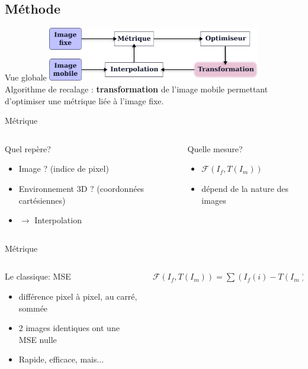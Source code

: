 \documentclass{beamer}
\begin{document}
\subsection{Méthode}
\begin{frame}{Vue globale}
\centering
\includegraphics[width=0.7\textwidth]{images/recalage.png}\\
Algorithme de recalage : {\bfseries transformation} de l'image mobile permettant d'optimiser une métrique liée à l'image fixe. 
\end{frame}
\begin{frame}{Métrique}
   \begin{columns}[T]
 \begin{column}{0.5\textwidth}
\begin{block}{Quel repère?}
\begin{itemize}
  \item Image ? (indice de pixel)
  \item Environnement 3D ? (coordonnées cartésiennes)
  \item $\rightarrow$ Interpolation
  \end{itemize}
\end{block}
 \end{column}
 \begin{column}{0.5\textwidth}
\begin{block}{Quelle mesure?}
\begin{itemize}
  \item $\mathcal{F}(I_f, T(I_m))$
  \item dépend de la nature des images
  \end{itemize}
\end{block}
\end{column}
\end{columns}
\end{frame}
\begin{frame}{Métrique}
\centering
   \begin{columns}[c]
 \begin{column}{0.5\textwidth}
\begin{block}{Le classique: MSE}
\begin{itemize}
  \item différence pixel à pixel, au carré, sommée
  \item 2 images identiques ont une MSE nulle
  \item Rapide, efficace, mais...
  \end{itemize}
\end{block}
 \end{column}
 \begin{column}{0.5\textwidth}
$\mathcal{F}(I_f, T(I_m)) = \sum{(I_f(i)-T(I_m)(i))^2}$
\end{column}
\end{columns}
\end{frame}
\end{document}
